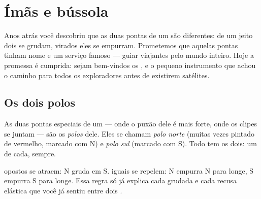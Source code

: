 \chapter{Ímãs e bússola}\label{ch:g4:magnets-and-compass}

Anos atrás você descobriu que as duas pontas de um  são
diferentes: de um jeito dois  se grudam, virados eles se
empurram. Prometemos que aquelas pontas tinham nome e um serviço
famoso --- guiar viajantes pelo mundo inteiro. Hoje a promessa é
cumprida: sejam bem-vindos os , e o pequeno instrumento que
achou o caminho para todos os exploradores antes de existirem
satélites.

\section{Os dois polos}

\begin{definition}[Polos]\label{def:g4:magnets-and-compass:poles}
As duas pontas especiais de um  --- onde o puxão dele é mais
forte, onde os clipes se juntam --- são os \emph{polos}
dele. Eles se chamam \emph{polo norte} (muitas
vezes pintado de vermelho, marcado com N) e \emph{polo
sul} (marcado com S). Todo  tem os dois: um de
cada, sempre.
\end{definition}

\begin{proposition}\label{prop:g4:magnets-and-compass:rule}
 opostos se atraem: N gruda em S.  iguais se repelem: N
empurra N para longe, S empurra S para longe. Essa regra só já
explica cada grudada e cada recusa elástica que você já sentiu entre
dois .
\end{proposition}

